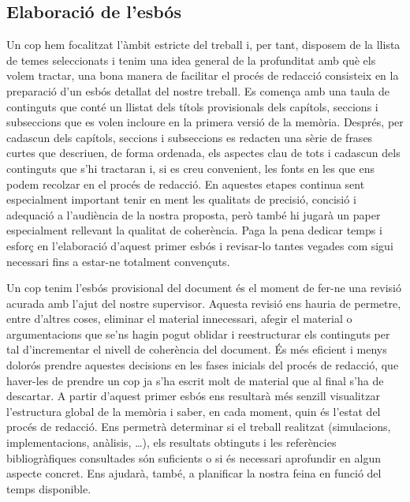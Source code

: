 \subsection{Elaboració de l'esbós} Un cop hem focalitzat l'àmbit estricte del treball i, per tant, disposem de la llista de temes seleccionats i tenim una idea general de la profunditat amb què els volem tractar, una bona manera de facilitar el procés de redacció consisteix en la preparació d'un esbós detallat del nostre treball. Es comença amb una taula de continguts que conté un llistat dels títols provisionals dels capítols, seccions i subseccions que es volen incloure en la primera versió de la memòria. Després, per cadascun dels capítols, seccions i subseccions es redacten una sèrie de frases curtes que descriuen, de forma ordenada, els aspectes clau de tots i cadascun dels continguts que s'hi tractaran i, si es creu convenient, les fonts en les que ens podem recolzar en el procés de redacció. En aquestes etapes continua sent especialment important tenir en ment les qualitats de precisió, concisió i adequació a l'audiència de la nostra proposta, però també hi jugarà un paper especialment rellevant la qualitat de coherència. Paga la pena dedicar temps i esforç en l'elaboració d'aquest primer esbós i revisar-lo tantes vegades com sigui necessari fins a estar-ne totalment convençuts.

Un cop tenim l'esbós provisional del document és el moment de fer-ne una revisió acurada amb l'ajut del nostre supervisor. Aquesta revisió ens hauria de permetre, entre d'altres coses, eliminar el material innecessari, afegir el material o argumentacions que se'ns hagin pogut oblidar i reestructurar els continguts per tal d'incrementar el nivell de coherència del document. És més eficient i menys dolorós prendre aquestes decisions en les fases inicials del procés de redacció, que haver-les de prendre un cop ja s'ha escrit molt de material que al final s'ha de descartar. A partir d'aquest primer esbós ens resultarà més senzill visualitzar l'estructura global de la memòria i saber, en cada moment, quin és l'estat del procés de redacció. Ens permetrà determinar si el treball realitzat (simulacions, implementacions, anàlisis, \ldots), els resultats obtinguts i les referències bibliogràfiques consultades són suficients o si és necessari aprofundir en algun aspecte concret. Ens ajudarà, també, a planificar la nostra feina en funció del temps disponible.

